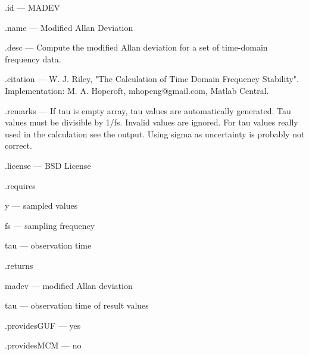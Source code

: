 \begin{tightdesc}
\item [\textsf{.id}] --- MADEV
\item [\textsf{.name}] --- Modified Allan Deviation
\item [\textsf{.desc}] --- Compute the modified Allan deviation for a set of time-domain frequency data.
\item [\textsf{.citation}] --- W. J. Riley, "The Calculation of Time Domain Frequency Stability". Implementation: M. A. Hopcroft, mhopeng@gmail.com, Matlab Central.
\item [\textsf{.remarks}] --- If tau is empty array, tau values are automatically generated. Tau values must be divisible by 1/fs. Invalid values are ignored. For tau values really used in the calculation see the output. Using sigma as uncertainty is probably not correct.
\item [\textsf{.license}] --- BSD License
\item [\textsf{.requires}] \rule{0em}{0em}
\begin{tightdesc}
\item [\textsf{y}] --- sampled values
\item [\textsf{fs}] --- sampling frequency
\item [\textsf{tau}] --- observation time
\end{tightdesc}
\item [\textsf{.returns}] \rule{0em}{0em}
\begin{tightdesc}
\item [\textsf{madev}] --- modified Allan deviation
\item [\textsf{tau}] --- observation time of result values
\end{tightdesc}
\item [\textsf{.providesGUF}] --- yes
\item [\textsf{.providesMCM}] ---  no
\end{tightdesc}
